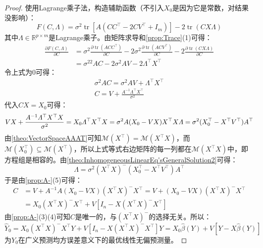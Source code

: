 \begin{proof}
	使用Lagrange乘子法，构造辅助函数（不引入$X_0$是因为它是常数，对结果没影响）：
	\begin{equation*}
		F(C,\varLambda)=\sigma^2\operatorname{tr}[A(CC^{\top}-2CV^{\top}+I_m)]-2\operatorname{tr}(CX\varLambda)
	\end{equation*}
	其中$\varLambda\in\mathbb{R}^{p\times m}$是Lagrange乘子。由矩阵求导和\cref{prop:Trace}(1)可得：
	\begin{align*}
		\frac{\partial F(C,\varLambda)}{\partial C}&=\sigma^2\frac{\partial\operatorname{tr}(ACC^{\top})}{\partial C}-2\sigma^2\frac{\partial\operatorname{tr}(ACV^{\top})}{\partial C}-2\frac{\partial\operatorname{tr}(CX\varLambda)}{\partial C} \\
		&=\sigma^22AC-2\sigma^2AV-2\varLambda^{\top}X^{\top}
	\end{align*}
	令上式为$0$可得：
	\begin{gather*}
		\sigma^2AC=\sigma^2AV+\varLambda^{\top}X^{\top} \\
		C=V+\frac{A^{-1}\varLambda^{\top}X^{\top}}{\sigma^2}
	\end{gather*}
	代入$CX=X_0$可得：
	\begin{equation*}
		VX+\frac{A^{-1}\varLambda^{\top}X^{\top}X}{\sigma^2}=X_0 \\
		\varLambda^{\top}X^{\top}X=\sigma^2A(X_0-VX) \\
		X^{\top}X\varLambda=\sigma^2(X_0^{\top}-X^{\top}V^{\top})A^{\top}
	\end{equation*}
	由\cref{theo:VectorSpaceAAAT}可知$\mathcal{M}(X^{\top})=\mathcal{M}(X^{\top}X)$，而$\mathcal{M}(X_0^{\top})\subseteq\mathcal{M}(X^{\top})$，所以上式等式右边矩阵的每一列都在$\mathcal{M}(X^{\top}X)$中，即方程组是相容的。由\cref{theo:InhomogeneousLinearEq'sGeneralSolution2}可得：
	\begin{equation*}
		\varLambda=\sigma^2(X^{\top}X)^-(X_0^{\top}-X^{\top}V^{\top})A^{\top}
	\end{equation*}
	于是由\cref{prop:A-}(5)可得：
	\begin{align*}
		C&=V+A^{-1}A(X_0-VX)(X^{\top}X)^-X^{\top}=V+(X_0-VX)(X^{\top}X)^-X^{\top} \\
		&=X_0(X^{\top}X)^-X^{\top}+V[I_n-X(X^{\top}X)^-X^{\top}]
	\end{align*}
	由\cref{prop:A-}(3)(4)可知$C$是唯一的，与$(X^{\top}X)^-$的选择无关。所以：
	\begin{equation*}
		\widehat{Y}_0=X_0(X^{\top}X)^-X^{\top}Y+V[I_n-X(X^{\top}X)^-X^{\top}]Y=X_0\hat{\beta}(Y)+V[Y-X\hat{\beta}(Y)]
	\end{equation*}
	为$Y_0$在广义预测均方误差意义下的最优线性无偏预测量。
\end{proof}
